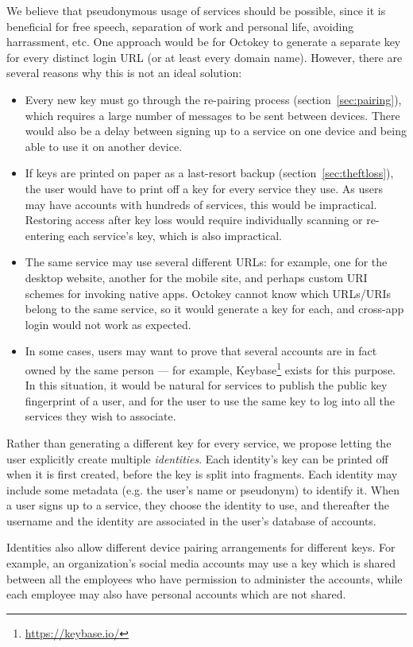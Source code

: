 We believe that pseudonymous usage of services should be possible, since it is beneficial for free
speech, separation of work and personal life, avoiding harrassment, etc. One approach would be for
Octokey to generate a separate key for every distinct login URL (or at least every domain name).
However, there are several reasons why this is not an ideal solution:
\begin{itemize}
\item Every new key must go through the re-pairing process (section~\ref{sec:pairing}), which
requires a large number of messages to be sent between devices. There would also be a delay between
signing up to a service on one device and being able to use it on another device.
\item If keys are printed on paper as a last-resort backup (section~\ref{sec:theftloss}), the user
would have to print off a key for every service they use. As users may have accounts with hundreds
of services, this would be impractical. Restoring access after key loss would require individually
scanning or re-entering each service's key, which is also impractical.
\item The same service may use several different URLs: for example, one for the desktop website,
another for the mobile site, and perhaps custom URI schemes for invoking native apps. Octokey
cannot know which URLs/URIs belong to the same service, so it would generate a key for each, and
cross-app login would not work as expected.
\item In some cases, users may want to prove that several accounts are in fact owned by the same
person --- for example, Keybase\footnote{\url{https://keybase.io/}} exists for this purpose. In this
situation, it would be natural for services to publish the public key fingerprint of a user, and for
the user to use the same key to log into all the services they wish to associate.
\end{itemize}

Rather than generating a different key for every service, we propose letting the user explicitly
create multiple \emph{identities}. Each identity's key can be printed off when it is first created,
before the key is split into fragments. Each identity may include some metadata (e.g. the user's
name or pseudonym) to identify it. When a user signs up to a service, they choose the identity to
use, and thereafter the username and the identity are associated in the user's database of accounts.

Identities also allow different device pairing arrangements for different keys. For example, an
organization's social media accounts may use a key which is shared between all the employees who
have permission to administer the accounts, while each employee may also have personal accounts
which are not shared.


